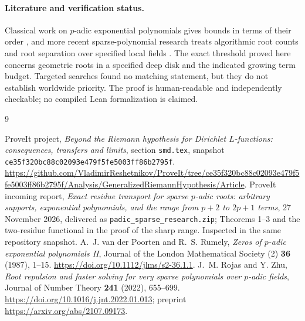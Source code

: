 \documentclass[11pt]{article}
\theoremstyle{remark}\newtheorem{remark}[theorem]{Remark}
\begin{document}
\paragraph{Literature and verification status.}
Classical work on $p$-adic exponential polynomials gives bounds in terms of their order \cite{vpr}, and more recent sparse-polynomial research treats algorithmic root counts and root separation over specified local fields \cite{rz}. The exact threshold proved here concerns geometric roots in a specified deep disk and the indicated growing term budget. Targeted searches found no matching statement, but they do not establish worldwide priority. The proof is human-readable and independently checkable; no compiled Lean formalization is claimed.

\clearpage
\begin{thebibliography}{9}
\raggedright
{} ProveIt project, \emph{Beyond the Riemann hypothesis for Dirichlet $L$-functions: consequences, transfers and limits}, section \texttt{smd.tex}, snapshot \texttt{ce35f320bc88c02093e479f5fe5003ff86b2795f}. \url{https://github.com/VladimirReshetnikov/ProveIt/tree/ce35f320bc88c02093e479f5fe5003ff86b2795f/Analysis/GeneralizedRiemannHypothesis/Article}.
 ProveIt incoming report, \emph{Exact residue transport for sparse $p$-adic roots: arbitrary supports, exponential polynomials, and the range from $p+2$ to $2p+1$ terms}, 27 November 2026, delivered as \texttt{padic\_sparse\_research.zip}; Theorems 1--3 and the two-residue functional in the proof of the sharp range. Inspected in the same repository snapshot.
 A.~J. van der Poorten and R.~S. Rumely, \emph{Zeros of $p$-adic exponential polynomials II}, Journal of the London Mathematical Society (2) \textbf{36} (1987), 1--15. \url{https://doi.org/10.1112/jlms/s2-36.1.1}.
 J.~M. Rojas and Y. Zhu, \emph{Root repulsion and faster solving for very sparse polynomials over $p$-adic fields}, Journal of Number Theory \textbf{241} (2022), 655--699. \url{https://doi.org/10.1016/j.jnt.2022.01.013}; preprint \url{https://arxiv.org/abs/2107.09173}.
\end{thebibliography}
\end{document}

